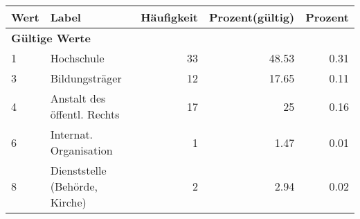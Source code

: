      \begin{longtable}{lXrrr}
     \toprule
     \textbf{Wert} & \textbf{Label} & \textbf{Häufigkeit} & \textbf{Prozent(gültig)} & \textbf{Prozent} \\
     \endhead
     \midrule
     \multicolumn{5}{l}{\textbf{Gültige Werte}}\\

     1 &
     \multicolumn{1}{X}{ Hochschule   } &


       \num{33} &
       \num[round-mode=places,round-precision=2]{48,53} &
         \num[round-mode=places,round-precision=2]{0,31} \\

     3 &
     \multicolumn{1}{X}{ Bildungsträger   } &


       \num{12} &
       \num[round-mode=places,round-precision=2]{17,65} &
         \num[round-mode=places,round-precision=2]{0,11} \\

     4 &
     \multicolumn{1}{X}{ Anstalt des öffentl. Rechts   } &


       \num{17} &
       \num[round-mode=places,round-precision=2]{25} &
         \num[round-mode=places,round-precision=2]{0,16} \\

     6 &
     \multicolumn{1}{X}{ Internat. Organisation   } &


       \num{1} &
       \num[round-mode=places,round-precision=2]{1,47} &
         \num[round-mode=places,round-precision=2]{0,01} \\

     8 &
     \multicolumn{1}{X}{ Dienststelle (Behörde, Kirche)   } &


       \num{2} &
       \num[round-mode=places,round-precision=2]{2,94} &
         \num[round-mode=places,round-precision=2]{0,02} \\


\end{longtable}
